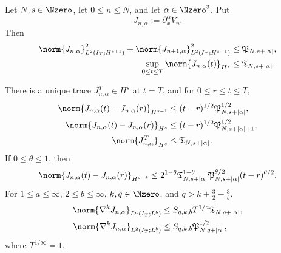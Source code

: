 \begin{theorem}
\label{u:thm:qc-mixed-jet}
\begin{samepage}
Let \(N,s\in\Nzero\), let \(0\le n\le N\), and let
\(\alpha\in\Nzero^3\).  Put
\[
 J_{n,\alpha}:=\partial_x^\alpha V_n.
\]
Then
\begin{align}
 \norm{J_{n,\alpha}}_{L^2(I_T;H^{s+1})}^2
 +\norm{J_{n+1,\alpha}}_{L^2(I_T;H^{s-1})}^2
 &\le \mathfrak P_{N,s+|\alpha|},
 \label{u:eq:qc-mixed-adjacent}\\
 \sup_{0\le t\le T}\norm{J_{n,\alpha}(t)}_{H^s}
 &\le \mathfrak T_{N,s+|\alpha|}.
 \label{u:eq:qc-mixed-trace}
\end{align}
\end{samepage}
There is a unique trace \(J_{n,\alpha}^T\in H^s\) at \(t=T\), and
for \(0\le r\le t\le T\),
\begin{align}
 \norm{J_{n,\alpha}(t)-J_{n,\alpha}(r)}_{H^{s-1}}
 &\le (t-r)^{1/2}\mathfrak P_{N,s+|\alpha|}^{1/2},
 \label{u:eq:qc-mixed-low-modulus}\\
 \norm{J_{n,\alpha}(t)-J_{n,\alpha}(r)}_{H^s}
 &\le (t-r)^{1/2}
        \mathfrak P_{N,s+|\alpha|+1}^{1/2},
 \label{u:eq:qc-mixed-strong-modulus}\\
 \norm{J_{n,\alpha}^T}_{H^s}
 &\le \mathfrak T_{N,s+|\alpha|}.
 \label{u:eq:qc-mixed-endpoint-size}
\end{align}
If \(0\le\theta\le1\), then
\begin{equation}
 \norm{J_{n,\alpha}(t)-J_{n,\alpha}(r)}_{H^{s-\theta}}
 \le
 2^{1-\theta}
 \mathfrak T_{N,s+|\alpha|}^{1-\theta}
 \mathfrak P_{N,s+|\alpha|}^{\theta/2}
 (t-r)^{\theta/2}.
 \label{u:eq:qc-mixed-interpolated-modulus}
\end{equation}
For \(1\le a\le\infty\), \(2\le b\le\infty\),
\(k,q\in\Nzero\), and
\(q>k+\frac32-\frac3b\),
\begin{align}
 \norm{\nabla^kJ_{n,\alpha}}_{L^a(I_T;L^b)}
 &\le S_{q,k,b}T^{1/a}\mathfrak T_{N,q+|\alpha|},
 \label{u:eq:qc-mixed-la-lb}\\
 \norm{\nabla^kJ_{n,\alpha}}_{L^2(I_T;L^b)}
 &\le S_{q,k,b}\mathfrak P_{N,q+|\alpha|}^{1/2},
 \label{u:eq:qc-mixed-l2-lb}
\end{align}
where \(T^{1/\infty}=1\).
\end{theorem}

